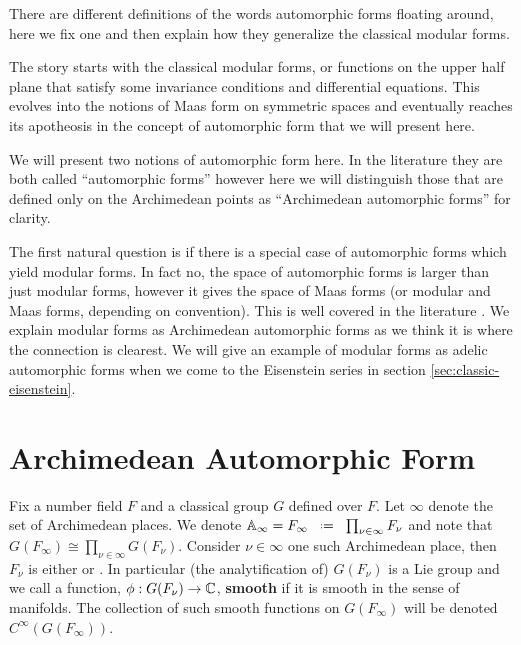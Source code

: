 There are different definitions of the words automorphic forms floating around, here we fix one and then explain how they generalize the classical modular forms.

The story starts with the classical modular forms, or functions on the upper half plane that satisfy some invariance conditions and differential equations. This evolves into the notions of Maas form on symmetric spaces and eventually reaches its apotheosis in the concept of automorphic form that we will present here. 

We will present two notions of automorphic form here. In the literature they are both called ``automorphic forms'' however here we will distinguish those that are defined only on the Archimedean points as ``Archimedean automorphic forms'' for clarity.

The first natural question is if there is a special case of automorphic forms which yield modular forms. In fact no, the space of automorphic forms is larger than just modular forms, however it gives the space of Maas forms (or modular and Maas forms, depending on convention). This is well covered in the literature \cite{emertonCLASSICALMODULARFORMS}\cite[3.2]{bumpAutomorphicFormsRepresentations1997}\cite{booherVIEWINGMODULARFORMS}\cite{garrettTransitionEisensteinSeries2016}. We explain modular forms as Archimedean automorphic forms as we think it is where the connection is clearest. We will give an example of modular forms as adelic automorphic forms when we come to the Eisenstein series in section \ref{sec:classic-eisenstein}.




\section{Archimedean Automorphic Form}
Fix a number field \(F\) and a classical group \(G\) defined over \(F\). Let \(\infty\) denote the set of Archimedean places. We denote \(\A_\infty = F_\infty \defeq \prod_{\nu\in\infty} F_\nu\) and note that \(G(F_\infty) \cong \prod_{\nu\in\infty}G(F_\nu)\). Consider \(\nu\in \infty\) one such Archimedean place, then \(F_\nu\) is either \R or \C. In particular (the analytification of) \(G(F_\nu)\) is a Lie group and we call a function, \(\phi: G(F_\nu) \to \C\), \textbf{smooth}  if it is smooth in the sense of manifolds. The collection of such smooth functions on \(G(F_\infty)\) will be denoted \(C^\infty(G(F_\infty))\).

